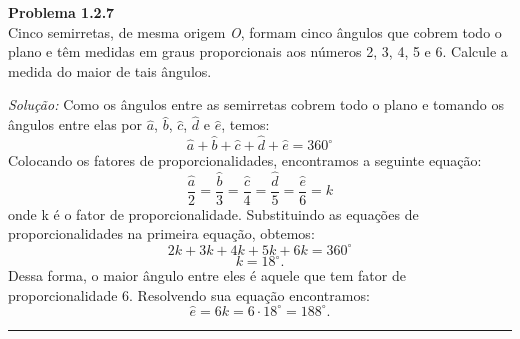 \documentclass[a4paper, 11pt]{book}
\newenvironment{problem}[2][Problema] 
    { \begin{mdframed}[backgroundcolor=gray!20] \textbf{#1 #2} \\}
    {  \end{mdframed}}
\newenvironment{solution}
    {\textit{Solução:}}
    {}
\begin{document}
\begin{problem}{1.2.7}
    \label{prob:1.2.7}
    Cinco semirretas, de mesma origem \textit{O}, formam cinco ângulos que cobrem todo o plano e têm medidas em graus proporcionais aos números 2, 3, 4, 5 e 6. Calcule a medida do  maior de tais ângulos. 
\end{problem}
\begin{solution}
    Como os ângulos entre as semirretas cobrem todo o plano e tomando os ângulos entre elas por $\hat{a}$, $\hat{b}$, $\hat{c}$, $\hat{d}$ e $\hat{e}$, temos:
    \[
    \hat{a} + \hat{b} + \hat{c} + \hat{d} + \hat{e} = 360^\circ
    \] 
    Colocando os fatores de proporcionalidades, encontramos a seguinte equação:
    \[
    \frac{\hat{a}}{2} = \frac{\hat{b}}{3} = \frac{\hat{c}}{4} = \frac{\hat{d}}{5} = \frac{\hat{e}}{6} = k
    \] 
    onde k é o fator de proporcionalidade. Substituindo as equações de proporcionalidades na primeira equação, obtemos:
    \[
    2k + 3k + 4k + 5k + 6k = 360^\circ
    \] 
    \[
    k = 18^\circ
    .\]
    Dessa forma, o maior ângulo entre eles é aquele que tem fator de proporcionalidade 6. Resolvendo sua equação encontramos:
    \[
    \hat{e} = 6k= 6\cdot18^\circ = 188^\circ
    .\] 
\end{solution}
\noindent\rule{7in}{2.8pt}
\\
\end{document}
